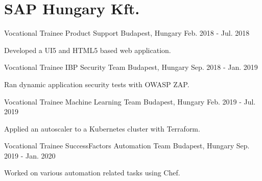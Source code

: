 
\section*{SAP Hungary Kft.}


\begin{cventries}

  \cventry
    {Vocational Trainee} %
    {Product Support} %
    {Budapest, Hungary} %
    {Feb. 2018 - Jul. 2018} %
    {
      \begin{cvitems} %
        \item {Developed a UI5 and HTML5 based web application.}
      \end{cvitems}
    }

  \cventry
    {Vocational Trainee} %
    {IBP Security Team} %
    {Budapest, Hungary} %
    {Sep. 2018 - Jan. 2019} %
    {
      \begin{cvitems} %
        \item {Ran dynamic application security tests with OWASP ZAP.}
      \end{cvitems}
    }

  \cventry
    {Vocational Trainee} %
    {Machine Learning Team} %
    {Budapest, Hungary} %
    {Feb. 2019 - Jul. 2019} %
    {
      \begin{cvitems} %
        \item {Applied an autoscaler to a Kubernetes cluster with Terraform.}
      \end{cvitems}
    }

  \cventry
    {Vocational Trainee} %
    {SuccessFactors Automation Team} %
    {Budapest, Hungary} %
    {Sep. 2019 - Jan. 2020} %
    {
      \begin{cvitems} %
        \item {Worked on various automation related tasks using Chef.}
      \end{cvitems}
    }


\end{cventries}
